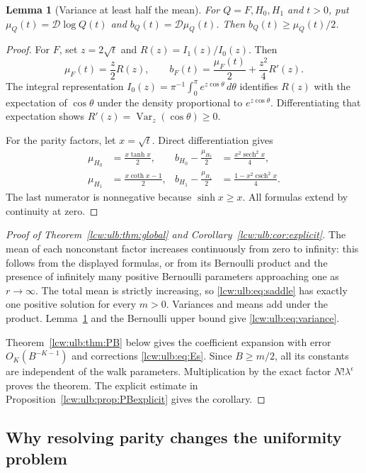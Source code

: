 \documentclass[11pt,letterpaper]{article}
\newtheorem{lemma}[theorem]{Lemma}
\theoremstyle{remark}\newtheorem{remark}[theorem]{Remark}
\newcommand{\Var}{\operatorname{Var}}\newcommand{\Cov}{\operatorname{Cov}}
\DeclareMathOperator{\sech}{sech}
\DeclareMathOperator{\csch}{csch}
\newcommand{\Dop}{\mathcal D}
\newcommand{\ep}{\epsilon}
\begin{document}
\begin{lemma}[Variance at least half the mean]\label{lcw:ulb:lem:half}
For $Q=F,H_0,H_1$ and $t>0$, put
$\mu_Q(t)=\Dop\log Q(t)$ and $b_Q(t)=\Dop\mu_Q(t)$.
Then $b_Q(t)\ge\mu_Q(t)/2$.
\end{lemma}
\begin{proof}
For $F$, set $z=2\sqrt t$ and $R(z)=I_1(z)/I_0(z)$. Then
\[
 \mu_F(t)=\frac z2R(z),\qquad
 b_F(t)=\frac{\mu_F(t)}2+\frac{z^2}{4}R'(z).
\]
The integral representation
$I_0(z)=\pi^{-1}\int_0^\pi e^{z\cos\theta}\,d\theta$
\cite{dlmfintegral} identifies $R(z)$ with the expectation of
$\cos\theta$ under the density proportional to $e^{z\cos\theta}$.
Differentiating that expectation shows
$R'(z)=\Var_z(\cos\theta)\ge0$.

For the parity factors, let $x=\sqrt t$. Direct differentiation gives
\begin{align*}
 \mu_{H_0}&=\frac{x\tanh x}{2},
 &b_{H_0}-\frac{\mu_{H_0}}2&=\frac{x^2\sech^2x}{4},\\
 \mu_{H_1}&=\frac{x\coth x-1}{2},
 &b_{H_1}-\frac{\mu_{H_1}}2&=
       \frac{1-x^2\csch^2x}{4}.
\end{align*}
The last numerator is nonnegative because $\sinh x\ge x$.
All formulas extend by continuity at zero.
\end{proof}

\begin{proof}[Proof of Theorem~\ref{lcw:ulb:thm:global} and
Corollary~\ref{lcw:ulb:cor:explicit}]
The mean of each nonconstant factor increases continuously from zero
to infinity: this follows from the displayed formulas, or from its
Bernoulli product and the presence of infinitely many positive
Bernoulli parameters approaching one as $r\to\infty$. The total mean
is strictly increasing, so \eqref{lcw:ulb:eq:saddle} has exactly one
positive solution for every $m>0$. Variances and means add under the
product. Lemma~\ref{lcw:ulb:lem:half} and the Bernoulli upper bound give
\eqref{lcw:ulb:eq:variance}.

Theorem~\ref{lcw:ulb:thm:PB} below gives the coefficient expansion with
error $O_K(B^{-K-1})$ and corrections \eqref{lcw:ulb:eq:Es}. Since
$B\ge m/2$, all its constants are independent of the walk parameters.
Multiplication by the exact factor $N!\lambda^\ep$ proves the theorem.
The explicit estimate in Proposition~\ref{lcw:ulb:prop:PBexplicit} gives
the corollary.
\end{proof}

\subsection{Why resolving parity changes the uniformity problem}
\end{document}

